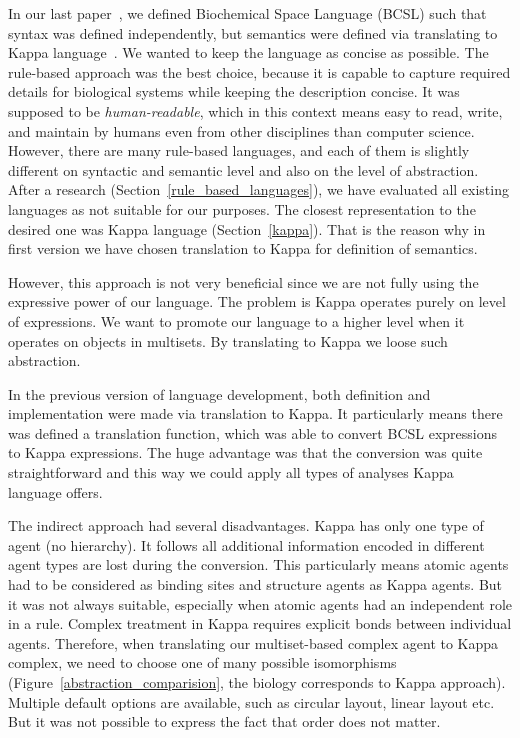\documentclass[12pt, twoside]{fithesis2} %
\begin{document}
In our last paper~\cite{Ded201627}, we defined Biochemical Space Language (BCSL) such that syntax was defined independently, but semantics were defined via translating to Kappa language~\cite{kappa_formal}. We wanted to keep the language as concise as possible. The rule-based approach was the best choice, because it is capable to capture required details for biological systems while keeping the description concise. It was supposed to be \emph{human-readable}, which in this context means easy to read, write, and maintain by humans even from other disciplines than computer science. However, there are many rule-based languages, and each of them is slightly different on syntactic and semantic level and also on the level of abstraction. After a research (Section~\ref{rule_based_languages}), we have evaluated all existing languages as not suitable for our purposes. The closest representation to the desired one was Kappa language (Section~\ref{kappa}). That is the reason why in first version we have chosen translation to Kappa for definition of semantics.

However, this approach is not very beneficial since we are not fully using the expressive power of our language. The problem is Kappa operates purely on level of expressions. We want to promote our language to a higher level when it operates on objects in multisets. By translating to Kappa we loose such abstraction. 

In the previous version of language development, both definition and implementation were made via translation to Kappa. It particularly means there was defined a translation function, which was able to convert BCSL expressions to Kappa expressions. The huge advantage was that the conversion was quite straightforward and this way we could apply all types of analyses Kappa language offers.

The indirect approach had several disadvantages. Kappa has only one type of agent (no hierarchy). It follows all additional information encoded in different agent types are lost during the conversion. This particularly means atomic agents had to be considered as binding sites and structure agents as Kappa agents. But it was not always suitable, especially when atomic agents had an independent role in a rule. Complex treatment in Kappa requires explicit bonds between individual agents. Therefore, when translating our multiset-based complex agent to Kappa complex, we need to choose one of many possible isomorphisms (Figure~\ref{abstraction_comparision}, the biology corresponds to Kappa approach). Multiple default options are available, such as circular layout, linear layout etc. But it was not possible to express the fact that order does not matter.
\end{document}
